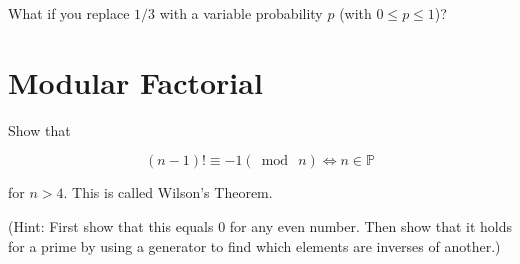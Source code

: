 \documentclass[12pt]{article}
\begin{document}
What if you replace $1/3$ with a variable probability $p$ (with $0 \leq p \leq 1$)?


\section{Modular Factorial}

Show that

$$
(n-1)! \equiv -1 (\bmod~n) \iff n \in \mathbb{P}
$$

for $n > 4$. This is called Wilson's Theorem.

(Hint: First show that this equals $0$ for any even number. Then show that it holds for a prime by using a generator to find which elements are inverses of another.)
\end{document}

